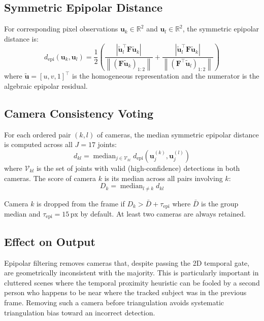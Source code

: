 \documentclass[11pt,a4paper]{article}
\newcommand{\R}{\mathbb{R}}
\newcommand{\norm}[1]{\left\lVert#1\right\rVert}
\begin{document}
\subsection{Symmetric Epipolar Distance}

For corresponding pixel observations $\mathbf{u}_k \in \R^2$ and $\mathbf{u}_l \in
\R^2$, the symmetric epipolar distance is:
\begin{equation}
  d_\text{epi}(\mathbf{u}_k, \mathbf{u}_l)
  = \frac{1}{2}\left(
      \frac{|{\tilde{\mathbf{u}}_l^\top \mathbf{F} \tilde{\mathbf{u}}_k}|}
           {\norm{(\mathbf{F}\tilde{\mathbf{u}}_k)_{1:2}}}
    + \frac{|{\tilde{\mathbf{u}}_l^\top \mathbf{F} \tilde{\mathbf{u}}_k}|}
           {\norm{(\mathbf{F}^\top\tilde{\mathbf{u}}_l)_{1:2}}}
    \right)
  \label{eq:epi_dist}
\end{equation}
where $\tilde{\mathbf{u}} = [u, v, 1]^\top$ is the homogeneous representation and
the numerator is the algebraic epipolar residual.

\subsection{Camera Consistency Voting}

For each ordered pair $(k, l)$ of cameras, the median symmetric epipolar distance is
computed across all $J = 17$ joints:
\[
  d_{kl} = \operatorname{median}_{j \in \mathcal{V}_{kl}} d_\text{epi}(\mathbf{u}^{(k)}_j, \mathbf{u}^{(l)}_j)
\]
where $\mathcal{V}_{kl}$ is the set of joints with valid (high-confidence) detections
in both cameras. The score of camera $k$ is its median across all pairs involving $k$:
\[
  D_k = \operatorname{median}_{l \neq k} d_{kl}
\]

Camera $k$ is dropped from the frame if $D_k > \bar{D} + \tau_\text{epi}$ where
$\bar{D}$ is the group median and $\tau_\text{epi} = 15\,\text{px}$ by default.
At least two cameras are always retained.

\subsection{Effect on Output}

Epipolar filtering removes cameras that, despite passing the 2D temporal gate, are
geometrically inconsistent with the majority. This is particularly important in
cluttered scenes where the temporal proximity heuristic can be fooled by a second
person who happens to be near where the tracked subject was in the previous frame.
Removing such a camera before triangulation avoids systematic triangulation bias
toward an incorrect detection.
\end{document}
